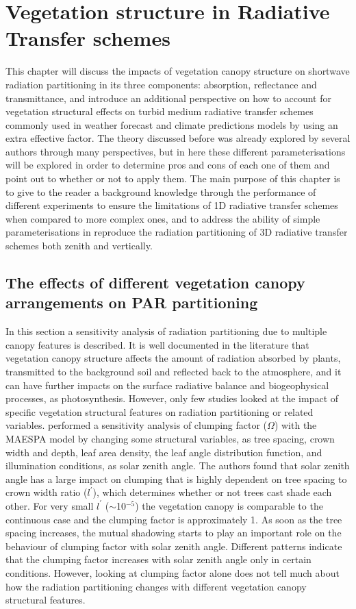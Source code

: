 \chapter{Vegetation structure in Radiative Transfer schemes}
This chapter will discuss the impacts of vegetation canopy structure on shortwave radiation partitioning in its three components: absorption, reflectance and transmittance, and introduce an additional perspective on how to account for vegetation structural effects on turbid medium radiative transfer schemes commonly used in weather forecast and climate predictions models by using an extra effective factor. The theory discussed before was already explored by several authors through many perspectives, but in here these different parameterisations will be explored in order to determine pros and cons of each one of them and point out to whether or not to apply them. The main purpose of this chapter is to give to the reader a background knowledge through the performance of different experiments to ensure the limitations of 1D radiative transfer schemes when compared to more complex ones, and to address the ability of simple parameterisations in reproduce the radiation partitioning of 3D radiative transfer schemes both zenith and vertically.

\section{The effects of different vegetation canopy arrangements on PAR partitioning}
In this section a sensitivity analysis of radiation partitioning due to multiple canopy features is described. It is well documented in the literature that vegetation canopy structure affects the amount of radiation absorbed by plants, transmitted to the background soil and reflected back to the atmosphere, and it can have further impacts on the surface radiative balance and biogeophysical processes, as photosynthesis. However, only few studies looked at the impact of specific vegetation structural features on radiation partitioning or related variables. 
\citet{Chen2008} performed a sensitivity analysis of clumping factor ($\Omega$) \citep{Nilson1971} with the MAESPA model \citep{Duursma2012} by changing some structural variables, as tree spacing, crown width and depth, leaf area density, the leaf angle distribution function, and illumination conditions, as solar zenith angle. The authors found that solar zenith angle has a large impact on clumping that is highly dependent on tree spacing to crown width ratio ($l^{\prime}$), which determines whether or not trees cast shade each other. For very small $l^{\prime}$ ($\sim$10$^{-5}$) the vegetation canopy is comparable to the continuous case and the clumping factor is approximately 1. As soon as the tree spacing increases, the mutual shadowing starts to play an important role on the behaviour of clumping factor with solar zenith angle. Different patterns indicate that the clumping factor increases with solar zenith angle only in certain conditions. However, looking at clumping factor alone does not tell much about how the radiation partitioning changes with different vegetation canopy structural features.

